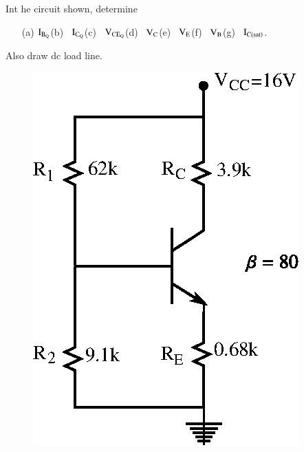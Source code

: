 \eject

\begin{problem}\label{prob3.10}
Int he circuit shown, determine 
\begin{itemize}
\item[(a)] $\textrm{I}_{\textrm{B}_{\textrm{Q}}}$\quad (b)~ $\textrm{I}_{\textrm{C}_{\textrm{Q}}}$\quad (c)~ $\textrm{V}_{\text{CE}_{\textrm{Q}}}$\quad (d)~ $\textrm{V}_{\textrm{C}}$\quad (e)~ $\textrm{V}_{\textrm{E}}$\quad (f)~ $\textrm{V}_{\textrm{B}}$\quad (g)~ $\textrm{I}_{\textrm{C}(\text{sat})}$.
\end{itemize}
Also draw dc load line.
\begin{figure}[H]
\centering
\includegraphics{chap3/fig3.23.eps}
\end{figure}
\end{problem}

